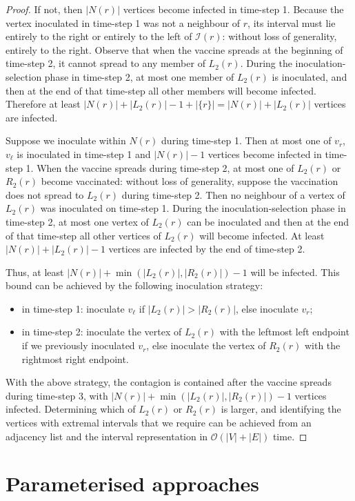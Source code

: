 \documentclass[unknownkeysallowed]{article}
\theoremstyle{definition}\newtheorem{strategy}{Strategy}
\theoremstyle{definition}\newtheorem{notation}{Notation}[theorem]
\newcommand*{\bigO}[1]{\mathcal{O}({#1})}
\begin{document}
\begin{proof}
If not, then $|N(r)|$ vertices become infected in time-step 1.  Because the vertex inoculated in time-step 1 was not a neighbour of $r$, its interval must lie entirely to the right or entirely to the left of $\mathcal{I}(r)$:  without loss of generality, entirely to the right.  Observe that when the vaccine spreads at the beginning of time-step 2, it cannot spread to any member of $L_2(r)$.   During the inoculation-selection phase in time-step 2, at most one member of $L_2(r)$ is inoculated, and then at the end of that time-step all other members will become infected. Therefore at least $|N(r)| + |L_2(r)| -1 + |\{r\}| = |N(r)| + |L_2(r)|$ vertices are infected.

Suppose we inoculate within $N(r)$ during time-step 1. Then at most one of $v_r$, $v_\ell$ is inoculated in time-step 1 and $|N(r)|-1$ vertices become infected in time-step 1.  When the vaccine spreads during time-step 2, at most one of $L_2(r)$ or $R_2(r)$ become vaccinated: without loss of generality, suppose the vaccination does not spread to $L_2(r)$ during time-step 2. Then no neighbour of a vertex of $L_2(r)$ was inoculated on time-step 1. During the inoculation-selection phase in time-step 2, at most one vertex of $L_2(r)$ can be inoculated and then at the end of that time-step all other vertices of $L_2(r)$ will become infected.  At least $|N(r)| + |L_2(r)| -1$ vertices are infected by the end of time-step 2. 

Thus, at least $|N(r)| + \min(|L_2(r)|, |R_2(r)|) -1$ will be infected.  This bound can be achieved by the following inoculation strategy:
\begin{itemize}
\item in time-step 1: inoculate $v_\ell$ if $|L_2(r)| > |R_2(r)|$, else inoculate $v_r$;
\item in time-step 2: inoculate the vertex of $L_2(r)$ with the leftmost left endpoint if we previously inoculated $v_r$, else inoculate the vertex of $R_2(r)$ with the rightmost right endpoint.  
\end{itemize}
With the above strategy, the contagion is contained after the vaccine spreads during time-step 3, with $|N(r)| + \min(|L_2(r)|, |R_2(r)|) -1$ vertices infected.  Determining which of $L_2(r)$ or $R_2(r)$ is larger, and identifying the vertices with extremal intervals that we require can be achieved from an adjacency list and the interval representation in $\bigO{|V|+|E|}$ time. 
\end{proof}


\section{Parameterised approaches}\label{sec:parameterize}
\end{document}
